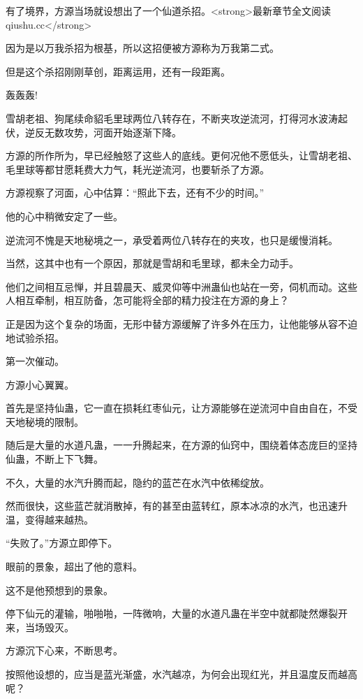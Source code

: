 
\begin{this_body}

有了境界，方源当场就设想出了一个仙道杀招。<strong>最新章节全文阅读qiushu.cc</strong>

因为是以万我杀招为根基，所以这招便被方源称为万我第二式。

但是这个杀招刚刚草创，距离运用，还有一段距离。

轰轰轰!

雪胡老祖、狗尾续命貂毛里球两位八转存在，不断夹攻逆流河，打得河水波涛起伏，逆反无数攻势，河面开始逐渐下降。

方源的所作所为，早已经触怒了这些人的底线。更何况他不愿低头，让雪胡老祖、毛里球等都甘愿耗费大力气，耗光逆流河，也要斩杀了方源。

方源视察了河面，心中估算：“照此下去，还有不少的时间。”

他的心中稍微安定了一些。

逆流河不愧是天地秘境之一，承受着两位八转存在的夹攻，也只是缓慢消耗。

当然，这其中也有一个原因，那就是雪胡和毛里球，都未全力动手。

他们之间相互忌惮，并且碧晨天、威灵仰等中洲蛊仙也站在一旁，伺机而动。这些人相互牵制，相互防备，怎可能将全部的精力投注在方源的身上？

正是因为这个复杂的场面，无形中替方源缓解了许多外在压力，让他能够从容不迫地试验杀招。

第一次催动。

方源小心翼翼。

首先是坚持仙蛊，它一直在损耗红枣仙元，让方源能够在逆流河中自由自在，不受天地秘境的限制。

随后是大量的水道凡蛊，一一升腾起来，在方源的仙窍中，围绕着体态庞巨的坚持仙蛊，不断上下飞舞。

不久，大量的水汽升腾而起，隐约的蓝芒在水汽中依稀绽放。

然而很快，这些蓝芒就消散掉，有的甚至由蓝转红，原本冰凉的水汽，也迅速升温，变得越来越热。

“失败了。”方源立即停下。

眼前的景象，超出了他的意料。

这不是他预想到的景象。

停下仙元的灌输，啪啪啪，一阵微响，大量的水道凡蛊在半空中就都陡然爆裂开来，当场毁灭。

方源沉下心来，不断思考。

按照他设想的，应当是蓝光渐盛，水汽越凉，为何会出现红光，并且温度反而越高呢？


\end{this_body}
